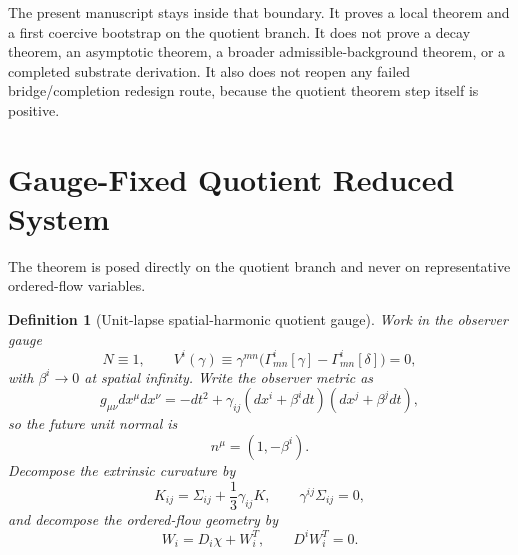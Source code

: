 \documentclass[11pt]{article}
\newtheorem{definition}{Definition}
\begin{document}
The present manuscript stays inside that boundary. It proves a local theorem and a first coercive bootstrap on the quotient branch. It does not prove a decay theorem, an asymptotic theorem, a broader admissible-background theorem, or a completed substrate derivation. It also does not reopen any failed bridge/completion redesign route, because the quotient theorem step itself is positive.

\section{Gauge-Fixed Quotient Reduced System}

The theorem is posed directly on the quotient branch and never on representative ordered-flow variables.

\begin{definition}[Unit-lapse spatial-harmonic quotient gauge]
\label{def:gauge}
Work in the observer gauge
\begin{equation}
N\equiv 1,
\qquad
V^i(\gamma)\equiv \gamma^{mn}\bigl(\Gamma^i_{mn}[\gamma]-\Gamma^i_{mn}[\delta]\bigr)=0,
\label{eq:gauge}
\end{equation}
with \(\beta^i\to 0\) at spatial infinity. Write the observer metric as
\begin{equation}
g_{\mu\nu}dx^\mu dx^\nu
=
-dt^2
+\gamma_{ij}(dx^i+\beta^idt)(dx^j+\beta^jdt),
\label{eq:ADM}
\end{equation}
so the future unit normal is
\begin{equation}
n^\mu=(1,-\beta^i).
\label{eq:normal}
\end{equation}
Decompose the extrinsic curvature by
\begin{equation}
K_{ij}
=
\Sigma_{ij}+\frac13\gamma_{ij}K,
\qquad
\gamma^{ij}\Sigma_{ij}=0,
\label{eq:Ksplit}
\end{equation}
and decompose the ordered-flow geometry by
\begin{equation}
W_i=D_i\chi+W_i^T,
\qquad
D^iW_i^T=0.
\label{eq:Wdecomp}
\end{equation}
\end{definition}
\end{document}
